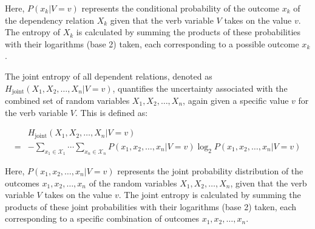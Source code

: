 Here, $P(x_k | V = v)$ represents the conditional probability of the outcome $x_k$ of the dependency relation $X_k$ given that the verb variable $V$ takes on the value $v$. The entropy of $X_k$ is calculated by summing the products of these probabilities with their logarithms (base 2) taken, each corresponding to a possible outcome $x_k$.

The joint entropy of all dependent relations, denoted as $H_{\text{joint}}(X_1, X_2, \ldots, X_n | V = v)$, quantifies the uncertainty associated with the combined set of random variables $X_1, X_2, \ldots, X_n$, again given a specific value $v$ for the verb variable $V$. This is defined as:

\begin{equation*}
\begin{split}
 & H_{\text{joint}}(X_1, X_2, \ldots, X_n | V=v) \\
=& -\sum\limits_{x_1\in{}\mathcal{X}_1}\cdots\sum\limits_{x_n\in{}\mathcal{X}_n}{P(x_1, x_2, \ldots,x_{n}|V=v)\log_2P(x_1, x_2, \ldots,x_n|V=v)}
\end{split}
\end{equation*}

Here, $P(x_1, x_2, \ldots, x_n | V = v)$ represents the joint probability distribution of the outcomes $x_1, x_2, \ldots, x_n$ of the random variables $X_1, X_2, \ldots, X_n$, given that the verb variable $V$ takes on the value $v$. The joint entropy is calculated by summing the products of these joint probabilities with their logarithms (base 2) taken, each corresponding to a specific combination of outcomes $x_1, x_2, \ldots, x_n$.







